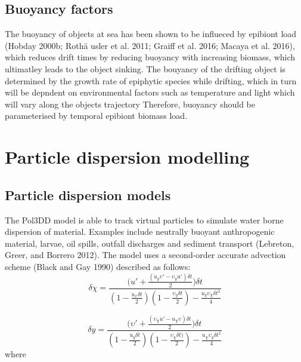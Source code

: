\documentclass[
]{article}
\begin{document}
\hypertarget{buoyancy-factors}{%
\subsection{Buoyancy factors}\label{buoyancy-factors}}

The buoyancy of objects at sea has been shown to be influeced by
epibiont load (Hobday 2000b; Rothä usler et al. 2011; Graiff et al.
2016; Macaya et al. 2016), which reduces drift times by reducing
buoyancy with increasing biomass, which ultimatley leads to the object
sinking. The bouyancy of the drifting object is determined by the growth
rate of epiphytic species while drifting, which in turn will be depndent
on environmental factors such as temperature and light which will vary
along the objects trajectory Therefore, buoyancy should be parameterised
by temporal epibiont biomass load.

\hypertarget{particle-dispersion-modelling}{%
\section{Particle dispersion
modelling}\label{particle-dispersion-modelling}}

\hypertarget{particle-dispersion-models}{%
\subsection{Particle dispersion
models}\label{particle-dispersion-models}}

The Pol3DD model is able to track virtual particles to simulate water
borne dispersion of material. Examples include neutrally buoyant
anthropogenic material, larvae, oil spills, outfall discharges and
sediment transport (Lebreton, Greer, and Borrero 2012). The model uses a
second-order accurate advection scheme (Black and Gay 1990) described as
follows:
\[\delta\chi=\frac{({u'+ \frac{(u_y\upsilon'-\upsilon_yu')\delta t}{2} )\delta t}}{(1-\frac{u_x\delta t}{2})(1-\frac{\upsilon_y\delta t}{2})-\frac{u_y\upsilon_\chi\delta t^2}{4}}\]

\[\delta y=\frac{({\upsilon' + \frac{(\upsilon_\chi u'-u_\chi\upsilon) \delta t}{2})\delta t}}{(1-\frac{u_y\delta t}{2})(1-\frac{\upsilon_\chi\delta t)}{2}) - \frac{u_\chi\upsilon_y\delta t^2}{4}}\]
where
\end{document}
